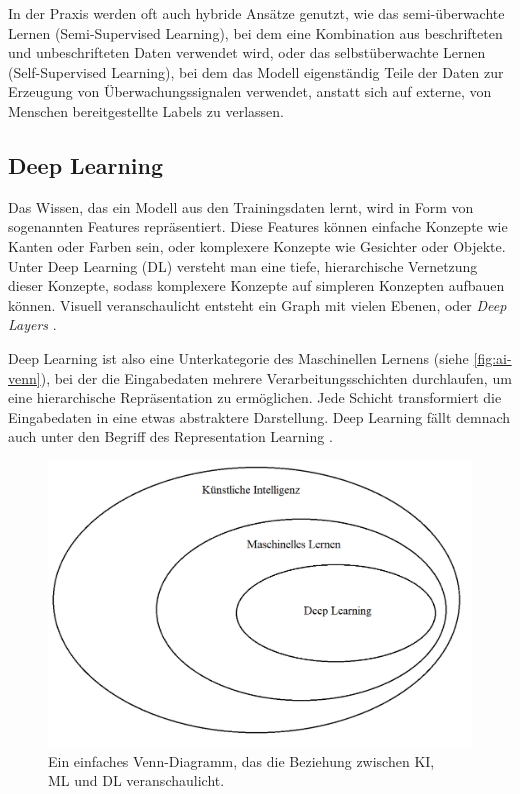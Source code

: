 In der Praxis werden oft auch hybride Ansätze genutzt, wie das semi-überwachte Lernen (Semi-Supervised Learning), bei dem eine Kombination aus beschrifteten und unbeschrifteten Daten verwendet wird, oder das selbstüberwachte Lernen (Self-Supervised Learning), bei dem das Modell eigenständig Teile der Daten zur Erzeugung von Überwachungssignalen verwendet, anstatt sich auf externe, von Menschen bereitgestellte Labels zu verlassen.

\subsection{Deep Learning} \label{subsec:deep-learning}

Das Wissen, das ein Modell aus den Trainingsdaten lernt, wird in Form von sogenannten Features repräsentiert. Diese Features können einfache Konzepte wie Kanten oder Farben sein, oder komplexere Konzepte wie Gesichter oder Objekte. Unter Deep Learning (DL) versteht man eine tiefe, hierarchische Vernetzung dieser Konzepte, sodass komplexere Konzepte auf simpleren Konzepten aufbauen können. Visuell veranschaulicht entsteht ein Graph mit vielen Ebenen, oder \emph{Deep Layers} \parencite{Goodfellow2016deeplearning}.

Deep Learning ist also eine Unterkategorie des Maschinellen Lernens (siehe \autoref{fig:ai-venn}), bei der die Eingabedaten mehrere Verarbeitungsschichten durchlaufen, um eine hierarchische Repräsentation zu ermöglichen. Jede Schicht transformiert die Eingabedaten in eine etwas abstraktere Darstellung. Deep Learning fällt demnach auch unter den Begriff des Representation Learning \parencite{Zhou2021machinelearning}.

\begin{figure}[t]
	\centering
	\includegraphics[width=12cm]{figure_ai_venn-diagram.png}
	\caption{Ein einfaches Venn-Diagramm, das die Beziehung zwischen KI,\\
	ML und DL veranschaulicht.}
	\label{fig:ai-venn}
\end{figure}

